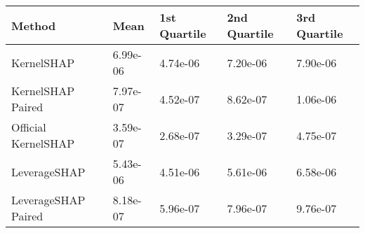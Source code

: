 \begin{tabular}{lllll}
  \toprule
  \textbf{Method} & \textbf{Mean} & \textbf{1st Quartile} & \textbf{2nd Quartile} & \textbf{3rd Quartile} \\ \midrule 
KernelSHAP & 6.99e-06 & 4.74e-06 & 7.20e-06 & 7.90e-06\\
KernelSHAP Paired & \cellcolor{silver!60}7.97e-07 & \cellcolor{silver!60}4.52e-07 & \cellcolor{bronze!60}8.62e-07 & \cellcolor{bronze!60}1.06e-06\\
Official KernelSHAP & \cellcolor{gold!60}3.59e-07 & \cellcolor{gold!60}2.68e-07 & \cellcolor{gold!60}3.29e-07 & \cellcolor{gold!60}4.75e-07\\
LeverageSHAP & 5.43e-06 & 4.51e-06 & 5.61e-06 & 6.58e-06\\
LeverageSHAP Paired & \cellcolor{bronze!60}8.18e-07 & \cellcolor{bronze!60}5.96e-07 & \cellcolor{silver!60}7.96e-07 & \cellcolor{silver!60}9.76e-07\\
\bottomrule
\end{tabular}
